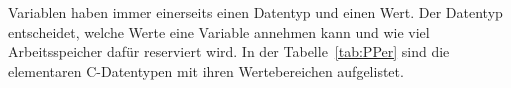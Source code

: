 
Variablen haben immer einerseits einen Datentyp und einen Wert. 
Der Datentyp entscheidet, welche Werte eine Variable annehmen kann und wie viel Arbeitsspeicher dafür reserviert wird.
In der Tabelle~\ref{tab:PPer} sind die elementaren C-Datentypen mit ihren Wertebereichen aufgelistet.

